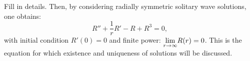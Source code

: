 \seperate

{\color{red} Fill in details.} Then, by considering radially symmetric solitary wave solutions, one obtains:
$$ R'' + \frac{1}{r}R' - R + R^3 = 0, $$
with initial condition $R'(0)=0$ and finite {\color{red}power}: $\underset{r\to\infty}{\lim} R(r) = 0$.
This is the equation for which existence and uniqueness of solutions will be discussed.

\seperate


%
